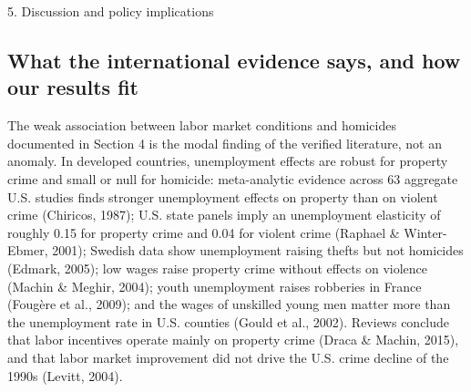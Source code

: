 5. Discussion and policy implications



\subsection{What the international evidence says, and how our results fit}



The weak association between labor market conditions and homicides documented in Section 4 is the modal finding of the verified literature, not an anomaly. In developed countries, unemployment effects are robust for property crime and small or null for homicide: meta-analytic evidence across 63 aggregate U.S. studies finds stronger unemployment effects on property than on violent crime (Chiricos, 1987); U.S. state panels imply an unemployment elasticity of roughly 0.15 for property crime and 0.04 for violent crime (Raphael \& Winter-Ebmer, 2001); Swedish data show unemployment raising thefts but not homicides (Edmark, 2005); low wages raise property crime without effects on violence (Machin \& Meghir, 2004); youth unemployment raises robberies in France (Fougère et al., 2009); and the wages of unskilled young men matter more than the unemployment rate in U.S. counties (Gould et al., 2002). Reviews conclude that labor incentives operate mainly on property crime (Draca \& Machin, 2015), and that labor market improvement did not drive the U.S. crime decline of the 1990s (Levitt, 2004).


